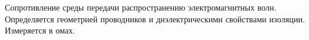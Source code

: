 Сопротивление среды передачи распространению
электромагнитных волн. Определяется геометрией
проводников и диэлектрическими свойствами изоляции.
Измеряется в омах.